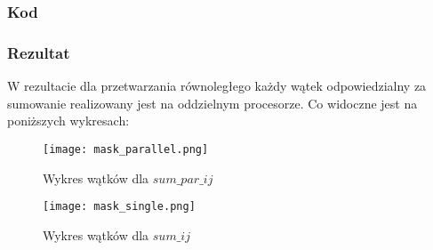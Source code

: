 \subsubsection{Kod}



\subsubsection{Rezultat}

W rezultacie dla przetwarzania równoległego każdy wątek odpowiedzialny za sumowanie realizowany jest na oddzielnym procesorze. Co widoczne jest na poniższych wykresach:

\begin{figure}[H]
  \texttt{[image: mask\_parallel.png]}
  \caption{Wykres wątków dla $sum\_par\_ij$}
\endminipage\hfill
{}
  \texttt{[image: mask\_single.png]}
  \caption{Wykres wątków dla $sum\_ij$}
\endminipage\hfill
\end{figure}
